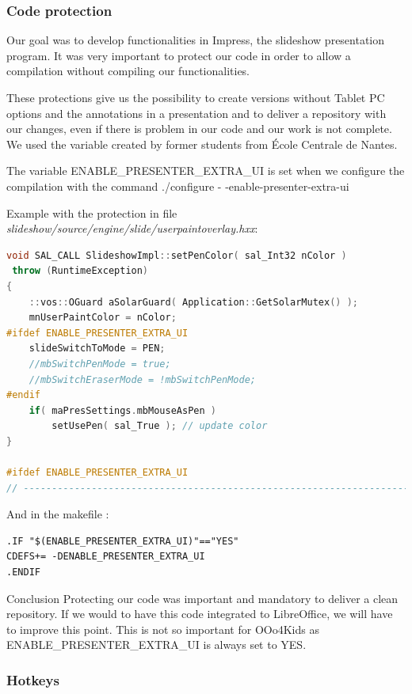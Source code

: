 \documentclass[a4paper,11pt]{article}
\begin{document}
\subsubsection*{Code protection}
Our goal was to develop functionalities in Impress, the slideshow presentation program. It was very important to protect our code in order to allow a compilation without compiling our functionalities.

These protections give us the possibility to create versions without Tablet PC options and the annotations in a presentation and to deliver a repository with our changes, even if there is problem in our code and our work is not complete. We used the variable created by former students from École Centrale de Nantes.

The variable ENABLE\_PRESENTER\_EXTRA\_UI is set when we configure the compilation with the command ./configure - -enable-presenter-extra-ui

Example with the protection in file \emph{slideshow/source/engine/slide/userpaintoverlay.hxx}:

\begin{lstlisting}[language=C++]
void SAL_CALL SlideshowImpl::setPenColor( sal_Int32 nColor )
 throw (RuntimeException)
{
	::vos::OGuard aSolarGuard( Application::GetSolarMutex() );
	mnUserPaintColor = nColor;
#ifdef ENABLE_PRESENTER_EXTRA_UI
    slideSwitchToMode = PEN;
	//mbSwitchPenMode = true;
	//mbSwitchEraserMode = !mbSwitchPenMode;
#endif
	if( maPresSettings.mbMouseAsPen )
		setUsePen( sal_True ); // update color
}

#ifdef ENABLE_PRESENTER_EXTRA_UI
// --------------------------------------------------------------------
\end{lstlisting}

And in the makefile :

\begin{verbatim}
.IF "$(ENABLE_PRESENTER_EXTRA_UI)"=="YES"
CDEFS+= -DENABLE_PRESENTER_EXTRA_UI
.ENDIF
\end{verbatim}

Conclusion Protecting our code was important and mandatory to deliver a clean repository. If we would to have this code integrated to LibreOffice, we will have to improve this point. This is not so important for OOo4Kids as ENABLE\_PRESENTER\_EXTRA\_UI is always set to YES.

\subsubsection*{Hotkeys}
\end{document}
